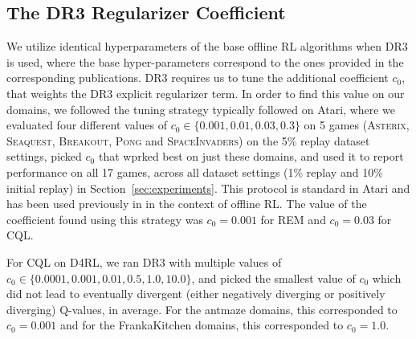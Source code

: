 \subsection{The DR3 Regularizer Coefficient}
\label{app:tuning_dr3}
\vspace{-0.2cm}
We utilize identical hyperparameters of the base offline RL algorithms when DR3 is used, where the base hyper-parameters correspond to the ones provided in the corresponding publications. DR3 requires us to tune the additional coefficient $c_0$, that weights the DR3 explicit regularizer term. In order to find this value on our domains, we followed the tuning strategy typically followed on Atari, where we evaluated four different values of $c_0 \in \{0.001, 0.01, 0.03, 0.3\}$ on 5 games (\textsc{Asterix}, \textsc{Seaquest}, \textsc{Breakout}, \textsc{Pong} and \textsc{SpaceInvaders}) on the 5\% replay dataset settings, picked $c_0$ that wprked best on just these domains, and used it to report performance on all 17 games, across all dataset settings (1\% replay and 10\% initial replay) in Section~\ref{sec:experiments}. This protocol is standard in Atari and has been used previously in \citet{agarwal2019optimistic,gulcehre2020rl,kumar2021implicit} in the context of offline RL. The value of the coefficient found using this strategy was $c_0 = 0.001$ for REM and $c_0 = 0.03$ for CQL.

For CQL on D4RL, we ran DR3 with multiple values of $c_0 \in \{0.0001, 0.001, 0.01, 0.5, 1.0, 10.0\}$, and picked the smallest value of $c_0$ which did not lead to eventually divergent (either negatively diverging or positively diverging) Q-values, in average. For the antmaze domains, this corresponded to $c_0=0.001$ and for the FrankaKitchen domains, this corresponded to $c_0=1.0$. 


